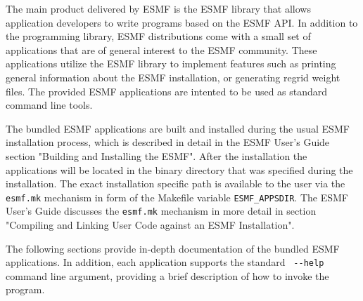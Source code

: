 
The main product delivered by ESMF is the ESMF library that allows application
developers to write programs based on the ESMF API. In addition to the 
programming library, ESMF distributions come with a small set of applications
that are of general interest to the ESMF community. These applications utilize
the ESMF library to implement features such as printing general information
about the ESMF installation, or generating regrid weight files. The provided
ESMF applications are intented to be used as standard command line tools.

The bundled ESMF applications are built and installed during the usual ESMF
installation process, which is described in detail in the ESMF User's Guide section "Building and Installing the ESMF". After the installation the
applications will be located in the binary directory that was specified during
the installation. The exact installation specific path is available to the user
via the {\tt esmf.mk} mechanism in form of the Makefile variable
{\tt ESMF\_APPSDIR}. The ESMF User's Guide discusses the
{\tt esmf.mk} mechanism in more detail in section "Compiling and Linking User
Code against an ESMF Installation".

The following sections provide in-depth documentation of the bundled ESMF
applications. In addition, each application supports the standard \verb+ --help + command line argument, providing a brief description of how to invoke
the program.


